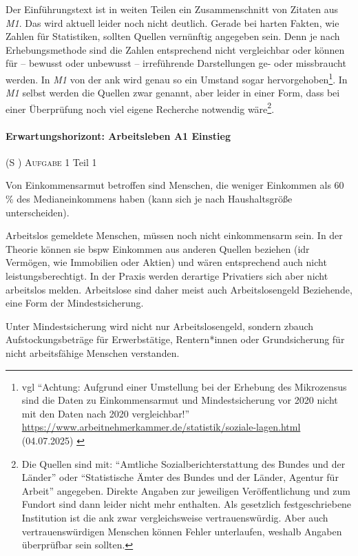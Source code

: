 Der Einführungstext ist in weiten Teilen ein Zusammenschnitt von Zitaten aus \emph{M1}. Das wird aktuell leider noch nicht deutlich. Gerade bei harten Fakten, wie Zahlen für Statistiken, sollten Quellen vernünftig angegeben sein. Denn je nach Erhebungsmethode sind die Zahlen entsprechend nicht vergleichbar oder können für -- bewusst oder unbewusst -- irreführende Darstellungen ge- oder missbraucht werden. In \emph{M1} von der \gls{ank} wird genau so ein Umstand sogar hervorgehoben\footnote{
    \gls{vgl} \enquote{Achtung: Aufgrund einer Umstellung bei der Erhebung des Mikrozensus sind die Daten zu Einkommensarmut und Mindestsicherung vor 2020 nicht mit den Daten nach 2020 vergleichbar!} \url{https://www.arbeitnehmerkammer.de/statistik/soziale-lagen.html} (04.07.2025) \label{MikrozensusNichtVgl.bar2020}}. 
In \emph{M1} selbst werden die Quellen zwar genannt, aber leider in einer Form, dass bei einer Überprüfung noch viel eigene Recherche notwendig wäre\footnote{
    Die Quellen sind mit: \enquote{Amtliche Sozialberichterstattung des Bundes und der Länder} oder \enquote{Statistische Ämter des Bundes und der Länder, Agentur für Arbeit} angegeben. Direkte Angaben zur jeweiligen Veröffentlichung und zum Fundort sind dann leider nicht mehr enthalten. Als gesetzlich festgeschriebene Institution ist die \gls{ank} zwar vergleichsweise vertrauenswürdig. Aber auch vertrauenswürdigen Menschen können Fehler unterlaufen, weshalb Angaben überprüfbar sein sollten.}.



\paragraph{Erwartungshorizont: Arbeitsleben A1 Einstieg} (\gls{S} \pageref{ARBEITSLEBEN-A1})
\textsc{Aufgabe 1} Teil 1 \quad
\begin{myitemize}
    \item Von Einkommensarmut betroffen sind Menschen, die weniger Einkommen als 60\,\% des Medianeinkommens haben (kann sich je nach Haushaltsgröße unterscheiden). 
    \item Arbeitslos gemeldete Menschen, müssen noch nicht einkommensarm sein. In der Theorie können sie \gls{bspw} Einkommen aus anderen Quellen beziehen (\gls{idr} Vermögen, wie Immobilien oder Aktien) und wären entsprechend auch nicht leistungsberechtigt. In der Praxis werden derartige Privatiers sich aber nicht arbeitslos melden. Arbeitslose sind daher meist auch Arbeitslosengeld Beziehende, eine Form der Mindestsicherung. 
    \item Unter Mindestsicherung wird nicht nur Arbeitslosengeld, sondern \gls{zb}auch Aufstockungsbeträge für Erwerbstätige, Rentern*innen oder Grundsicherung für nicht arbeitsfähige Menschen verstanden. 
\end{myitemize}

